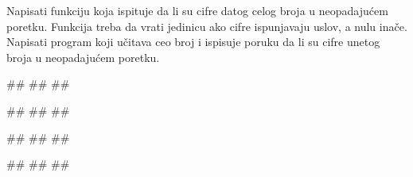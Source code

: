 \begin{Exercise}[label=FUN_16] 
Napisati funkciju  koja ispituje da li su
cifre datog celog broja u neopadajućem poretku. Funkcija treba da vrati
jedinicu ako cifre ispunjavaju uslov, a nulu inače. 
Napisati program koji učitava ceo broj i ispisuje
poruku da li su cifre unetog broja u neopadajućem poretku.

\begin{miditest}
\begin{upotreba}{1}
#\naslovInt#
##
##
\end{upotreba}
\end{miditest}
\begin{miditest}
\begin{upotreba}{2}
#\naslovInt#
##
##
\end{upotreba}
\end{miditest}

\begin{miditest}
\begin{upotreba}{3}
#\naslovInt#
##
##
\end{upotreba}
\end{miditest}
\begin{miditest}
\begin{upotreba}{4}
#\naslovInt#
##
##
\end{upotreba}
\end{miditest}

\end{Exercise}
\ifresenja 
\begin{Answer}[ref=FUN_16]
\end{Answer} 
\fi



